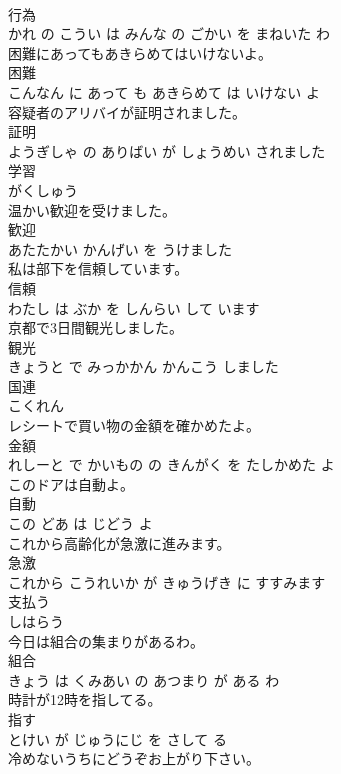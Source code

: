 \documentclass[8pt]{extreport}
\begin{document}
\begin{CJK}{UTF8}{min}
\\	行為 
\\	かれ の こうい は みんな の ごかい を まねいた わ			
\\	困難にあってもあきらめてはいけないよ。	
\\	困難 
\\	こんなん に あって も あきらめて は いけない よ			
\\	容疑者のアリバイが証明されました。	
\\	証明 
\\	ようぎしゃ の ありばい が しょうめい されました			
\\	学習	
\\	がくしゅう			
\\	温かい歓迎を受けました。	
\\	歓迎 
\\	あたたかい かんげい を うけました			
\\	私は部下を信頼しています。	
\\	信頼 
\\	わたし は ぶか を しんらい して います			
\\	京都で3日間観光しました。	
\\	観光 
\\	きょうと で みっかかん かんこう しました			
\\	国連	
\\	こくれん			
\\	レシートで買い物の金額を確かめたよ。	
\\	金額 
\\	れしーと で かいもの の きんがく を たしかめた よ			
\\	このドアは自動よ。	
\\	自動 
\\	この どあ は じどう よ			
\\	これから高齢化が急激に進みます。	
\\	急激 
\\	これから こうれいか が きゅうげき に すすみます			
\\	支払う	
\\	しはらう			
\\	今日は組合の集まりがあるわ。	
\\	組合 
\\	きょう は くみあい の あつまり が ある わ			
\\	時計が12時を指してる。	
\\	指す 
\\	とけい が じゅうにじ を さして る			
\\	冷めないうちにどうぞお上がり下さい。	

\end{CJK}
\end{document}
